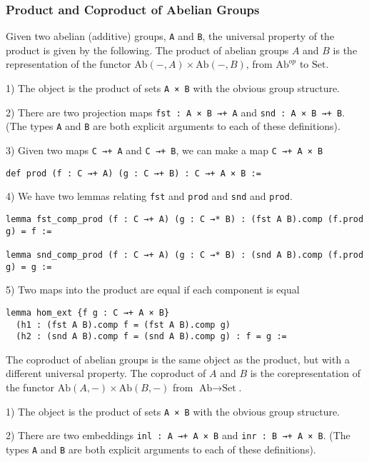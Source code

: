 \documentclass[12pt]{article} %
\theoremstyle{definition}
\theoremstyle{definition}
\theoremstyle{definition}
\theoremstyle{definition}
\begin{document}
\subsubsection{Product and Coproduct of Abelian Groups}

Given two abelian (additive) groups, \lstinline{A} and \lstinline {B}, 
the universal property of the product is given by the following.
The product of abelian groups $A$ and $B$ is the representation
of the functor $\text{Ab}(-, A) \times \text{Ab}(-, B)$, from
$\text{Ab}^{op}$ to $\text{Set}$.

1) The object is the product of sets \lstinline{A × B} with the obvious
group structure.

2) There are two projection maps \lstinline{fst : A × B →+ A} and 
\lstinline{snd : A × B →+ B}. (The types \lstinline{A} and \lstinline{B}
are both explicit arguments to each of these definitions).

3) Given two maps \lstinline{C →+ A} and \lstinline{C →+ B}, we can make a map
\lstinline{C →+ A × B}
\begin{lstlisting}
def prod (f : C →+ A) (g : C →+ B) : C →+ A × B :=
\end{lstlisting}

4) We have two lemmas relating \lstinline{fst} and \lstinline{prod} and \lstinline{snd}
and \lstinline{prod}.
\begin{lstlisting}
lemma fst_comp_prod (f : C →+ A) (g : C →* B) : (fst A B).comp (f.prod g) = f :=
  
lemma snd_comp_prod (f : C →+ A) (g : C →* B) : (snd A B).comp (f.prod g) = g :=
\end{lstlisting}

5) Two maps into the product are equal if each component is equal
\begin{lstlisting}
lemma hom_ext {f g : C →+ A × B}
  (h1 : (fst A B).comp f = (fst A B).comp g) 
  (h2 : (snd A B).comp f = (snd A B).comp g) : f = g :=
\end{lstlisting}

The coproduct of abelian groups is the same object as the product, 
but with a different universal property. The coproduct of $A$ and $B$
is the corepresentation of the functor $\text{Ab}(A, -) \times \text{Ab}(B, -)$
from $\text{Ab} \to \text{Set}$.

1) The object is the product of sets \lstinline{A × B} with the obvious
group structure.

2) There are two embeddings \lstinline{inl : A →+ A × B} and 
\lstinline{inr : B →+ A × B}. (The types \lstinline{A} and \lstinline{B}
are both explicit arguments to each of these definitions).
\end{document}
